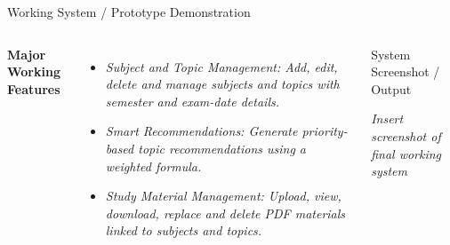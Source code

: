 \documentclass[aspectratio=169,11pt]{beamer}
\newcommand{\placeholder}[1]{%
\textit{\color{GEUGrey}#1}
}
\begin{document}
\begin{frame}{Working System / Prototype Demonstration}

\begin{columns}[T,totalwidth=\textwidth]

\vspace{-0.8cm}
\textbf{\color{GEUBlue}Major Working Features}

\begin{itemize}\itemsep3pt
    \item \placeholder{Subject and Topic Management: Add, edit, delete and manage subjects and topics with semester and exam-date details.}
    \item \placeholder{Smart Recommendations: Generate priority-based topic recommendations using a weighted formula.}
    \item \placeholder{Study Material Management: Upload, view, download, replace and delete PDF materials linked to subjects and topics.}
\end{itemize}


\begin{block}{System Screenshot / Output}

\centering
\vspace{11mm}

\placeholder{
Insert screenshot of final working system
}

\vspace{11mm}

\end{block}

\end{columns}

\vfill



\end{frame}
\end{document}
